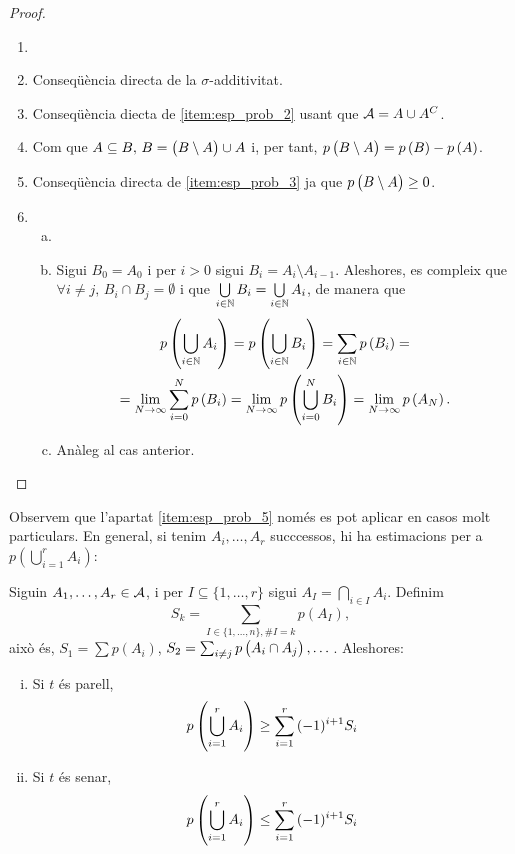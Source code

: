 \begin{proof}
    \begin{enumerate}
        \item[]
        \item Conseqüència directa de la $\sigma$-additivitat.
        \item Conseqüència diecta de \ref{item:esp_prob_2} usant que $\mathcal{A} = A\cup A^C$.
        \item Com que $A\subseteq B,\, B=\left( B\setminus A\right) \cup A$ i, per tant, $p\left( B\setminus A \right) = p\left( B\right) - p\left( A\right)$.
        \item Conseqüència directa de \ref{item:esp_prob_3} ja que $p\left( B\setminus A\right)\geq 0$.
        \item 
        \begin{enumerate}[a)]
            \item[]
            \item Sigui $B_0=A_0$ i per $i>0$ sigui $B_i = A_i\setminus A_{i-1}$. Aleshores, es compleix que $\forall i\neq j, \, B_i \cap B_j =\emptyset$ i que $\bigcup\limits_{i\in \mathbb{N}} B_i = \bigcup\limits_{i\in\mathbb{N}} A_i$, de manera que
            \begin{gather*}
                p\left(\bigcup\limits_{i\in\mathbb{N}} A_i\right) = p\left(\bigcup\limits_{i\in\mathbb{N}} B_i\right) = \sum\limits_{i\in\mathbb{N}} p\left( B_i\right) =\\
                = \lim\limits_{N\to\infty} \sum_{i=0}^N p\left( B_i\right) = \lim\limits_{N\to\infty} p\left( \bigcup_{i=0}^N B_i\right) = \lim\limits_{N\to\infty} p\left( A_N\right).
            \end{gather*}
            \item Anàleg al cas anterior.
        \end{enumerate}
    \end{enumerate}
\end{proof}

Observem que l'apartat \ref{item:esp_prob_5} només es pot aplicar en casos molt particulars. En general, si tenim $A_i,\dots,A_r$ succcessos,
hi ha estimacions per a $p(\bigcup_{i=1}^{r}{A_i})$:

\begin{teo}
    Siguin $A_1,\dots,A_r\in\mathcal{A}$, i per $I\subseteq\{1,\dots,r\}$ sigui $A_I = \bigcap\limits_{i \in I}{A_i}$. Definim
    \[
        S_k = \sum_{I \in \{1,\dots,n\},\#I=k}{p(A_I)},
    \]
    això és, $S_1 = \sum{p(A_i)}$, $S_2 = \sum_{i \neq j}p\left( A_i \cap A_j\right),\dots$. Aleshores:
    \begin{enumerate}[i)]
         \item Si $t$ és parell,
            \[p\left(\bigcup_{i=1}^{r}{A_i}\right) \geq \sum_{i=1}^{r}{(-1)^{i+1}S_i}\]
         \item Si $t$ és senar,
            \[p\left(\bigcup_{i=1}^{r}{A_i}\right) \leq \sum_{i=1}^{r}{(-1)^{i+1}S_i}\]
    \end{enumerate}
\end{teo}

